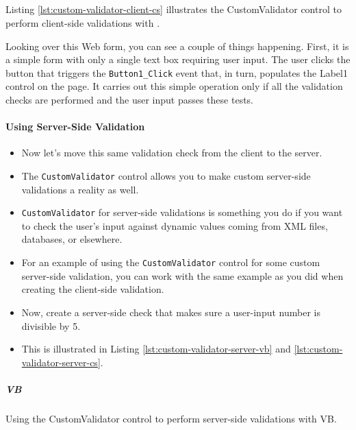 

\subparagraph*{\cs}
Listing {\ref{lst:custom-validator-client-cs}} illustrates the CustomValidator control to perform client-side validations with \cs.



Looking over this Web form, you can see a couple of things happening. First, it is a simple form with
only a single text box requiring user input. The user clicks the button that triggers the \texttt{Button1\_Click}
event that, in turn, populates the Label1 control on the page. It carries out this simple operation only if
all the validation checks are performed and the user input passes these tests.

\paragraph*{Using Server-Side Validation}
\begin{itemize}
	\item Now let’s move this same validation check from the client to the server. 
	\item The \texttt{CustomValidator} control allows you to make custom server-side validations a reality as well. 
	
	\item \texttt{CustomValidator} for server-side validations is something you do if you want to check the user’s input against dynamic values coming from XML files, databases, or elsewhere.
	
	\item For an example of using the \texttt{CustomValidator} control for some custom server-side validation, you can work with the same example as you did when creating the client-side validation. 
	\item Now, create a server-side check that makes sure a user-input number is divisible by 5. 
	\item This is illustrated in Listing {\ref{lst:custom-validator-server-vb}} and {\ref{lst:custom-validator-server-cs}}.
\end{itemize}


\subparagraph*{VB}
Using the CustomValidator control to perform server-side validations with VB.




